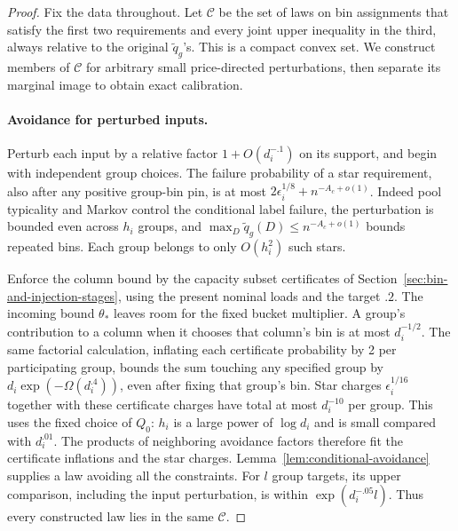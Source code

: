 \begin{proof}\leavevmode\par
Fix the data throughout. Let \(\mathcal C\) be the set of laws on bin
assignments that satisfy the first two requirements and every joint upper
inequality in the third, always relative to the original
\(\widetilde q_g\)'s. This is a compact convex set. We construct members
of \(\mathcal C\) for arbitrary small price-directed perturbations, then
separate its marginal image to obtain exact calibration.

\paragraph{Avoidance for perturbed inputs.}
Perturb each input by a relative factor \(1+O(d_i^{-.1})\) on its
support, and begin with independent group choices. The failure probability
of a star requirement, also after any positive group-bin pin, is at most
\(2\epsilon_i^{1/8}+n^{-A_c+o(1)}\). Indeed pool typicality and Markov
control the conditional label failure, the perturbation is bounded even
across \(h_i\) groups, and
\(\max_D\widetilde q_g(D)\le n^{-A_c+o(1)}\) bounds repeated bins.
Each group belongs to only \(O(h_i^2)\) such stars.

Enforce the column bound by the capacity subset certificates of
Section~\ref{sec:bin-and-injection-stages}, using the present nominal
loads and the target \(.2\). The incoming bound \(\theta_*\) leaves
room for the fixed bucket multiplier. A group's contribution to a column
when it chooses that column's bin is at most \(d_i^{-1/2}\). The same
factorial calculation, inflating each certificate probability by 2 per
participating group, bounds the sum touching any specified group by
\(d_i\exp(-\Omega(d_i^{.4}))\), even after fixing that group's bin.
Star charges \(\epsilon_i^{1/16}\) together with these certificate
charges have total at most \(d_i^{-10}\) per group. This uses the fixed
choice of \(Q_0\): \(h_i\) is a large power of \(\log d_i\) and is
small compared with \(d_i^{.01}\). The products of neighboring avoidance
factors therefore fit the certificate inflations and the star charges.
Lemma~\ref{lem:conditional-avoidance} supplies a law avoiding all the
constraints. For \(l\) group targets, its upper comparison, including
the input perturbation, is within \(\exp(d_i^{-.05}l)\). Thus every
constructed law lies in the same \(\mathcal C\).


\end{proof}
